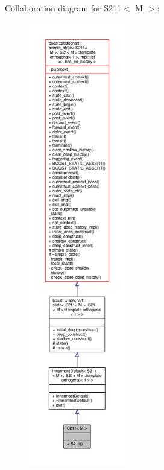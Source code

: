 Collaboration diagram for S211$<$ M $>$\+:
\nopagebreak
\begin{figure}[H]
\begin{center}
\leavevmode
\includegraphics[height=550pt]{struct_s211__coll__graph}
\end{center}
\end{figure}
